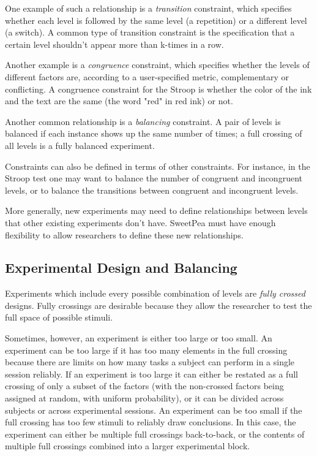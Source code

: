 One example of such a relationship is a \emph{transition} constraint, which specifies whether each level is followed by the same level (a repetition) or a different level (a switch). A common type of transition constraint is the specification that a certain level shouldn't appear more than k-times in a row.

Another example is a \emph{congruence} constraint, which specifies whether the levels of different factors are, according to a user-specified metric, complementary or conflicting. A congruence constraint for the Stroop is whether the color of the ink and the text are the same (the word "red" in red ink) or not.

Another common relationship is a \emph{balancing} constraint. A pair of levels is balanced if each instance shows up the same number of times; a full crossing of all levels is a fully balanced experiment.

Constraints can also be defined in terms of other constraints. For instance, in the Stroop test one may want to balance the number of congruent and incongruent levels, or to balance the transitions between congruent and incongruent levels.

More generally, new experiments may need to define relationships between levels that other existing experiments don't have. SweetPea must have enough flexibility to allow researchers to define these new relationships.

\subsection{Experimental Design and Balancing}

Experiments which include every possible combination of levels are \emph{fully crossed} designs. Fully crossings are desirable because they allow the researcher to test the full space of possible stimuli.

Sometimes, however, an experiment is either too large or too small. An experiment can be too large if it has too many elements in the full crossing because there are limits on how many tasks a subject can perform in a single session reliably. If an experiment is too large it can either be restated as a full crossing of only a subset of the factors (with the non-crossed factors being assigned at random, with uniform probability), or it can be divided across subjects or across experimental sessions. An experiment can be too small if the full crossing has too few stimuli to reliably draw conclusions. In this case, the experiment can either be multiple full crossings back-to-back, or the contents of multiple full crossings combined into a larger experimental block.

